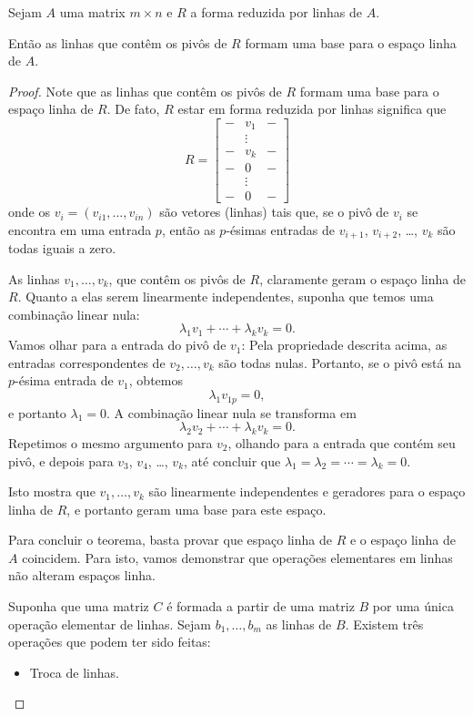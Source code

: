 \begin{theorem}
	Sejam $A$ uma matrix $m\times n$ e $R$ a forma reduzida por linhas de $A$.
	
	Então as linhas que contêm os pivôs de $R$ formam uma base para o espaço linha de $A$.
\end{theorem}
\begin{proof}
	Note que as linhas que contêm os pivôs de $R$ formam uma base para o espaço linha de $R$. De fato, $R$ estar em forma reduzida por linhas significa que
	\[R=\begin{bmatrix}-&v_1&-\\&\vdots&\\-&v_k&-\\-&0&-\\&\vdots&\\-&0&-\end{bmatrix}\]
	onde os $v_i=(v_{i1},\ldots,v_{in})$ são vetores (linhas) tais que, se o pivô de $v_i$ se encontra em uma entrada $p$, então as $p$-ésimas entradas de $v_{i+1}$, $v_{i+2}$, \ldots, $v_k$ são todas iguais a zero.
	
	As linhas $v_1,\ldots,v_k$, que contêm os pivôs de $R$, claramente geram o espaço linha de $R$. Quanto a elas serem linearmente independentes, suponha que temos uma combinação linear nula:
	\[\lambda_1 v_1+\cdots+\lambda_k v_k=0.\]
	Vamos olhar para a entrada do pivô de $v_1$: Pela propriedade descrita acima, as entradas correspondentes de $v_2,\ldots,v_k$ são todas nulas. Portanto, se o pivô está na $p$-ésima entrada de $v_1$, obtemos
	\[\lambda_1 v_{1p}=0,\]
	e portanto $\lambda_1=0$. A combinação linear nula se transforma em
	\[\lambda_2 v_2+\cdots+\lambda_k v_k=0.\]
	Repetimos o mesmo argumento para $v_2$, olhando para a entrada que contém seu pivô, e depois para $v_3$, $v_4$, \ldots, $v_k$, até concluir que $\lambda_1=\lambda_2=\cdots=\lambda_k=0$.
	
	Isto mostra que $v_1,\ldots,v_k$ são linearmente independentes e geradores para o espaço linha de $R$, e portanto geram uma base para este espaço.
	
	Para concluir o teorema, basta provar que espaço linha de $R$ e o espaço linha de $A$ coincidem. Para isto, vamos demonstrar que operações elementares em linhas não alteram espaços linha.
	
	Suponha que uma matriz $C$ é formada a partir de uma matriz $B$ por uma única operação elementar de linhas. Sejam $b_1,\ldots,b_m$ as linhas de $B$. Existem três operações que podem ter sido feitas:
	\begin{itemize}
		\item Troca de linhas.


\end{itemize}
\end{proof}
